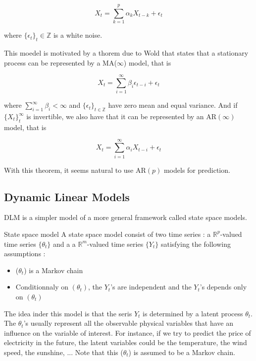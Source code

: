 \documentclass{article}
\begin{document}
$$X_t = \sum_{k=1}^p \alpha_k X_{t-k} + \epsilon_t$$

where $\{ \epsilon_t \}_t \in \mathbb{Z}$ is a white noise.

This moedel is motivated by a thorem due to Wold that states that a stationary process can be represented by a MA($\infty$) model, that is

$$X_t = \sum_{i=1}^{\infty} \beta_i \epsilon_{t-i} + \epsilon_t$$

where $\sum_{i=1}^\infty \beta_i < \infty$ and $\{\epsilon_t\}_{t \in \mathbb{Z}}$ have zero mean and equal variance. And if $\{ X_t \}_t^\infty$ is invertible, we also have that it can be represented by an AR$(\infty)$ model, that is

$$X_t = \sum_{i=1}^{\infty} \alpha_i X_{t-i} + \epsilon_t$$

With this theorem, it seems natural to use AR$(p)$ models for prediction.

\subsection*{Dynamic Linear Models}
DLM is a simpler model of a more general framework called state space models. \\

\begin{definition}{State space model}
A state space model consist of two time series : a $\mathbb{R}^p$-valued time series $\{\theta_t\}$ and a a $\mathbb{R}^m$-valued time series $\{Y_t\}$ satisfying the following assumptions :

\begin{itemize}
        \item ($\theta_t$) is a Markov chain
        \item Conditionnaly on $(\theta_t)$, the $Y_t$'s are independent and the $Y_t$'s depends only on $(\theta_t)$
\end{itemize}
\label{statespace}
\end{definition}

The idea inder this model is that the seris $Y_t$ is determined by a latent process $\theta_t$. The $\theta_t$'s usually represent all the observable physical variables that have an influence on the variable of interest. For instance, if we try to predict the price of electricity in the future, the latent variables could be the temperature, the wind speed, the sunshine, ... Note that this ($\theta_t$) is assumed to be a Markov chain. \\
\end{document}
